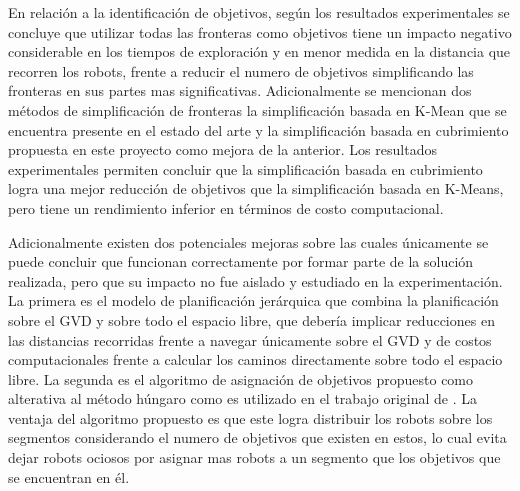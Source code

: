 
En relación a la identificación de objetivos, según los resultados
experimentales se concluye que utilizar todas las fronteras como objetivos
tiene un impacto negativo considerable en los tiempos de exploración y en menor
medida en la distancia que recorren los robots, frente a reducir el numero de
objetivos simplificando las fronteras en sus partes mas significativas.
Adicionalmente se mencionan dos métodos de simplificación de fronteras la
simplificación basada en K-Mean que se encuentra presente en el estado del arte y
la simplificación basada en cubrimiento propuesta en este proyecto como mejora
de la anterior. Los resultados experimentales permiten concluir que la
simplificación basada en cubrimiento logra una mejor reducción de objetivos que la
simplificación basada en K-Means, pero tiene un rendimiento inferior en
términos de costo computacional. 

Adicionalmente existen dos potenciales mejoras sobre las cuales únicamente se
puede concluir que funcionan correctamente por formar parte de la solución
realizada, pero que su impacto no fue aislado y estudiado en la
experimentación. La primera es el modelo de planificación jerárquica que
combina la planificación sobre el GVD y sobre todo el espacio libre, que
debería implicar reducciones en las distancias recorridas frente a navegar
únicamente sobre el GVD y de costos computacionales frente a calcular los
caminos directamente sobre todo el espacio libre. La segunda es el algoritmo de
asignación de objetivos propuesto como alterativa al método húngaro como es
utilizado en el trabajo original de \cite{wurm2008coordinated}. La ventaja del
algoritmo propuesto es que este logra distribuir los robots sobre los segmentos
considerando el numero de objetivos que existen en estos, lo cual evita dejar
robots ociosos por asignar mas robots a un segmento que los objetivos que se
encuentran en él.




